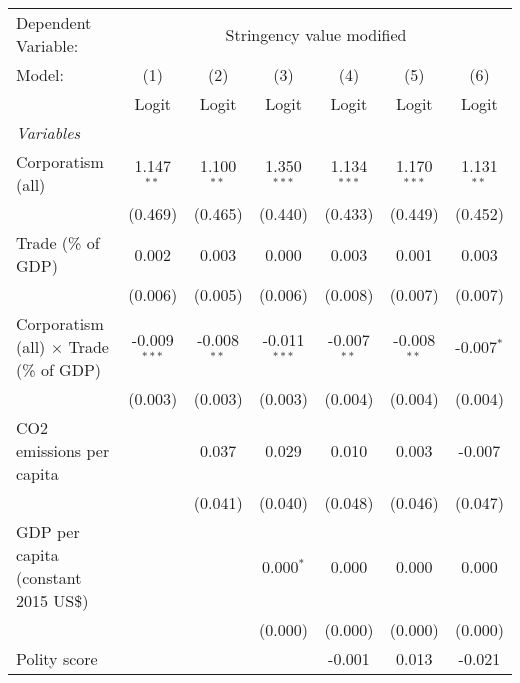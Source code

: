 
\begingroup
\centering
\begin{tabular}{lcccccc}
   \toprule
   Dependent Variable: & \multicolumn{6}{c}{Stringency value modified}\\
   Model:                                         & (1)            & (2)           & (3)            & (4)           & (5)           & (6)\\  
                                                  &  Logit         & Logit         & Logit          & Logit         & Logit         & Logit\\  
   \midrule
   \emph{Variables}\\
   Corporatism (all)                              & 1.147$^{**}$   & 1.100$^{**}$  & 1.350$^{***}$  & 1.134$^{***}$ & 1.170$^{***}$ & 1.131$^{**}$\\   
                                                  & (0.469)        & (0.465)       & (0.440)        & (0.433)       & (0.449)       & (0.452)\\   
   Trade (\% of GDP)                              & 0.002          & 0.003         & 0.000          & 0.003         & 0.001         & 0.003\\   
                                                  & (0.006)        & (0.005)       & (0.006)        & (0.008)       & (0.007)       & (0.007)\\   
   Corporatism (all) $\times$ Trade (\% of GDP)   & -0.009$^{***}$ & -0.008$^{**}$ & -0.011$^{***}$ & -0.007$^{**}$ & -0.008$^{**}$ & -0.007$^{*}$\\   
                                                  & (0.003)        & (0.003)       & (0.003)        & (0.004)       & (0.004)       & (0.004)\\   
   CO2 emissions per capita                       &                & 0.037         & 0.029          & 0.010         & 0.003         & -0.007\\   
                                                  &                & (0.041)       & (0.040)        & (0.048)       & (0.046)       & (0.047)\\   
   GDP per capita (constant 2015 US\$)            &                &               & 0.000$^{*}$    & 0.000         & 0.000         & 0.000\\   
                                                  &                &               & (0.000)        & (0.000)       & (0.000)       & (0.000)\\   
   Polity score                                   &                &               &                & -0.001        & 0.013         & -0.021\\   

\end{tabular}
